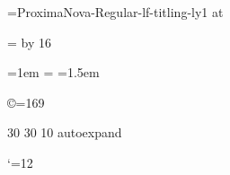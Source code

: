 \font\logofont=ProximaNova-Regular-lf-titling-ly1 at \cheadsize

\newdimen\logobarthickness
\logobarthickness=\logofont
\divide\logobarthickness by 16
\def\logolineskip{\vskip4\logobarthickness}

\def\stackedlogo#1#2{%
  \begingroup%
  \offinterlineskip%
  \logofont%
  \setbox0=\hbox{DRISCOLL}%
  \vbox{%
    \hrule height \logobarthickness%
    \logolineskip%
    \copy0%
    \logolineskip%
    \hbox to \wd0{#1BROOK#2}%
    \logolineskip%
    \hbox to \wd0{#1PRESS#2}%
    \logolineskip%
    \hrule height \logobarthickness%
  }%
  \endgroup%
}

\def\leftlogo{\stackedlogo{}{\hss}}
\def\centerlogo{\stackedlogo{\hss}{\hss}}
\def\rightlogo{\stackedlogo{\hss}{}}

\def\linelogo{%
  \begingroup%
  \offinterlineskip%
  \logofont%
  \vbox{%
    \hrule height \logobarthickness%
    \logolineskip%
    \hbox{DRISCOLL BROOK PRESS}%
    \logolineskip%
    \hrule height \logobarthickness%
  }%
  \endgroup%
}

%
%

\def\raggedleft{\parindent=0pt\parfillskip=0pt\leftskip=0pt plus \hsize\relax}
\def\raggedright{\parindent=0pt\parfillskip=0pt\rightskip=0pt plus \hsize\relax}
\def\centered{\raggedleft\raggedright}
\newdimen\leading \leading=15pt

\def\authorinfoheading#1{\bigskip\bigskip{\sc\centered#1\par}}
\def\authorinfoitem#1{\medskip{\centered#1\par}}
\def\connect#1#2{\authorinfoheading{#1}\authorinfoitem{#2}}
\def\genre#1{\authorinfoheading{#1}}
\def\genrebook#1{\authorinfoitem{#1}}

\def\titleleading{\linespacing{1.1}}

\def\linespacing#1{\baselineskip=#1\fontdimen6\the\font}

\parindent=1em
\normalbaselineskip=\leading
\normalbaselines
\emergencystretch=1.5em

%
%

\def\emph#1{{\it #1}}
\def\leadin#1{\nobreak\noindent{\sc #1}}

\chardef\copyright=169

\rm

%
%

\pdffontexpand\rm 30 30 10 autoexpand

\catcode`\@=12
